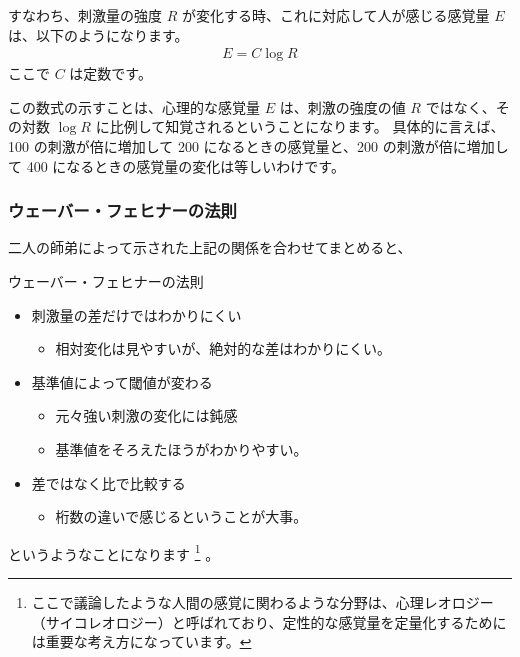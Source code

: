 \documentclass[uplatex,dvipdfmx,a4paper,11pt]{jsarticle}
\begin{document}
すなわち、刺激量の強度 $R$ が変化する時、これに対応して人が感じる感覚量 $E$ は、以下のようになります。
\begin{align*}
	E = C \log R
\end{align*}
ここで $C$ は定数です。

この数式の示すことは、心理的な感覚量 $E$ は、刺激の強度の値 $R$ ではなく、その対数 $\log R $ に比例して知覚されるということになります。
具体的に言えば、100 の刺激が倍に増加して 200 になるときの感覚量と、200 の刺激が倍に増加して 400 になるときの感覚量の変化は等しいわけです。

\subsubsection{ウェーバー・フェヒナーの法則}

二人の師弟によって示された上記の関係を合わせてまとめると、
\large
	\begin{itembox}[l]{ウェーバー・フェヒナーの法則}
		\begin{itemize}
			\item 刺激量の差だけではわかりにくい
			\begin{itemize}
				\item 相対変化は見やすいが、絶対的な差はわかりにくい。
			\end{itemize}
			\item 基準値によって閾値が変わる
			\begin{itemize}
				\item 元々強い刺激の変化には鈍感
				\item 基準値をそろえたほうがわかりやすい。
			\end{itemize}
			\item 差ではなく比で比較する
			\begin{itemize}
				\item 桁数の違いで感じるということが大事。
			\end{itemize}
		\end{itemize}
	\end{itembox}
\normalsize
というようなことになります
\footnote{
	ここで議論したような人間の感覚に関わるような分野は、心理レオロジー（サイコレオロジー）と呼ばれており、定性的な感覚量を定量化するためには重要な考え方になっています。
}
。
\end{document}
